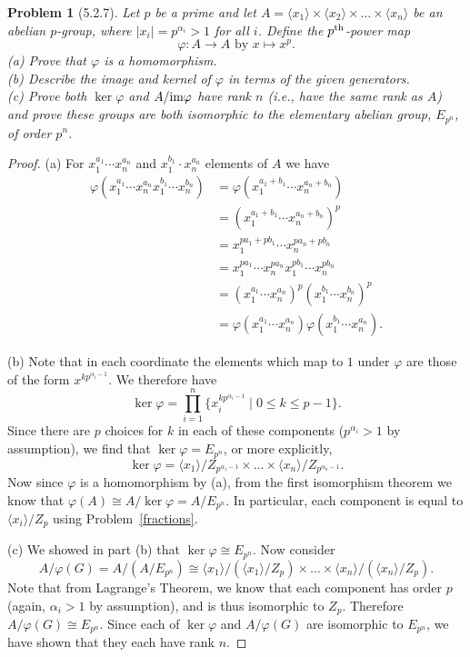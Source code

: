 \documentclass{article}
\newtheorem{problem}{Problem}
\begin{document}
\begin{problem}[5.2.7]
\label{pthpower}
Let $p$ be a prime and let $A = \langle x_1 \rangle \times \langle x_2 \rangle \times \dots \times \langle x_n \rangle$ be an abelian $p$-group, where $|x_i| = p^{\alpha_i} > 1$ for all $i$. Define the $p^{\textup{th}}$-\emph{power map}
\[
\text{$\varphi : A \to A$ by $x \mapsto x^p$.}
\]
(a) Prove that $\varphi$ is a homomorphism.\\
(b) Describe the image and kernel of $\varphi$ in terms of the given generators.\\
(c) Prove both $\ker \varphi$ and $A/\textup{im} \varphi$ have rank $n$ (i.e., have the same rank as $A$) and prove these groups are both isomorphic to the elementary abelian group, $E_{p^n}$, of order $p^n$.
\end{problem}
\begin{proof}
(a) For $x_1^{a_1} \cdots x_n^{a_n}$ and $x_1^{b_1} \cdot x_n^{a_n}$ elements of $A$ we have
\begin{align*}
\varphi(x_1^{a_1} \cdots x_n^{a_n}x_1^{b_1} \cdots x_n^{b_n})
&= \varphi(x_1^{a_1+b_1} \cdots x_n^{a_n+b_n})\\
&= (x_1^{a_1+b_1} \cdots x_n^{a_n+b_n})^p\\
&= x_1^{pa_1+pb_1} \cdots x_n^{pa_n+pb_n}\\
&= x_1^{pa_1} \cdots x_n^{pa_n}x_1^{pb_1} \cdots x_n^{pb_n}\\
&= (x_1^{a_1} \cdots x_n^{a_n})^p(x_1^{b_1} \cdots x_n^{b_n})^p\\
&= \varphi(x_1^{a_1} \cdots x_n^{a_n})\varphi(x_1^{b_1} \cdots x_n^{a_n}).
\end{align*}

(b) Note that in each coordinate the elements which map to $1$ under $\varphi$ are those of the form $x^{kp^{\alpha_i-1}}$. We therefore have
\[
\ker \varphi = \prod_{i = 1}^n \{x_i^{kp^{\alpha_i-1}} \mid 0 \leq k \leq p-1\}.
\]
Since there are $p$ choices for $k$ in each of these components ($p^{\alpha_i} > 1$ by assumption), we find that $\ker \varphi = E_{p^n}$, or more explicitly,
\[
\ker \varphi = \langle x_1 \rangle/Z_{p^{\alpha_1-1}} \times \dots \times \langle x_n \rangle/Z_{p^{\alpha_n-1}}.
\]
Now since $\varphi$ is a homomorphism by (a), from the first isomorphism theorem we know that $\varphi(A) \cong A/\ker \varphi = A/E_{p^n}$. In particular, each component is equal to $\langle x_i \rangle /Z_p$ using Problem~\ref{fractions}.

(c) We showed in part (b) that $\ker \varphi \cong E_{p^n}$. Now consider
\[
A/\varphi(G) = A/(A/E_{p^n}) \cong \langle x_1 \rangle/(\langle x_1 \rangle/Z_p) \times \dots \times \langle x_n \rangle/(\langle x_n \rangle/Z_p).
\]
Note that from Lagrange's Theorem, we know that each component has order $p$ (again, $\alpha_i > 1$ by assumption), and is thus isomorphic to $Z_p$. Therefore $A/\varphi(G) \cong E_{p^n}$. Since each of $\ker \varphi$ and $A/\varphi(G)$ are isomorphic to $E_{p^n}$, we have shown that they each have rank $n$.
\end{proof}
\end{document}
